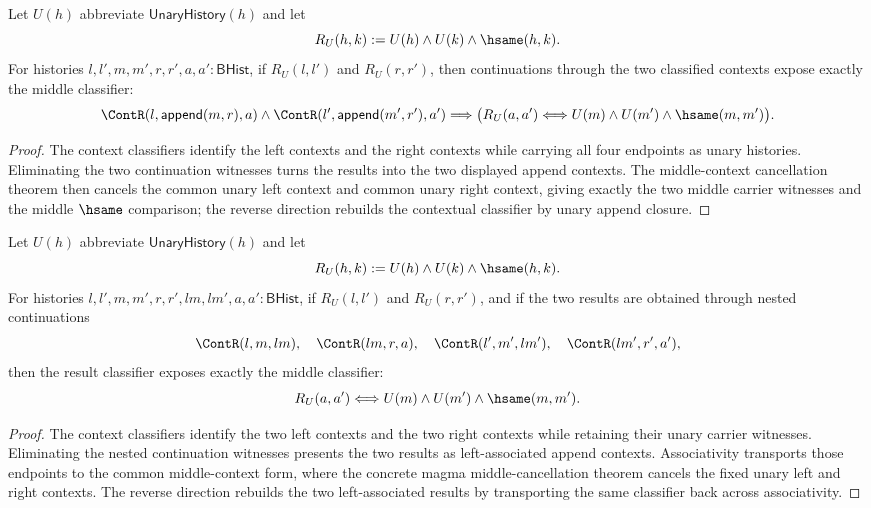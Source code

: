 \begin{theorem}
\label{thm:concrete-unary-history-magma-cont-common-context-classifier}
Let $U(h)$ abbreviate $\mathsf{UnaryHistory}(h)$ and let
$$
R_U(h,k):=U(h)\land U(k)\land\hsame(h,k).
$$
For histories $l,l',m,m',r,r',a,a':\mathsf{BHist}$, if
$R_U(l,l')$ and $R_U(r,r')$, then continuations through the two classified
contexts expose exactly the middle classifier:
$$
\ContR(l,\mathsf{append}(m,r),a)\land
\ContR(l',\mathsf{append}(m',r'),a')
\Longrightarrow
\bigl(R_U(a,a')\Longleftrightarrow
  U(m)\land U(m')\land\hsame(m,m')\bigr).
$$
\end{theorem}
\begin{proof}
The context classifiers identify the left contexts and the right contexts
while carrying all four endpoints as unary histories. Eliminating the two
continuation witnesses turns the results into the two displayed append
contexts. The middle-context cancellation theorem then cancels the common
unary left context and common unary right context, giving exactly the two
middle carrier witnesses and the middle $\hsame$ comparison; the reverse
direction rebuilds the contextual classifier by unary append closure.
\end{proof}

\begin{theorem}
\label{thm:concrete-unary-history-magma-cont-nested-common-context-classifier}
Let $U(h)$ abbreviate $\mathsf{UnaryHistory}(h)$ and let
$$
R_U(h,k):=U(h)\land U(k)\land\hsame(h,k).
$$
For histories $l,l',m,m',r,r',lm,lm',a,a':\mathsf{BHist}$, if
$R_U(l,l')$ and $R_U(r,r')$, and if the two results are obtained through
nested continuations
$$
\ContR(l,m,lm),\quad \ContR(lm,r,a),\quad
\ContR(l',m',lm'),\quad \ContR(lm',r',a'),
$$
then the result classifier exposes exactly the middle classifier:
$$
R_U(a,a')
\Longleftrightarrow
U(m)\land U(m')\land\hsame(m,m').
$$
\end{theorem}
\begin{proof}
The context classifiers identify the two left contexts and the two right
contexts while retaining their unary carrier witnesses. Eliminating the nested
continuation witnesses presents the two results as left-associated append
contexts. Associativity transports those endpoints to the common middle-context
form, where the concrete magma middle-cancellation theorem cancels the fixed
unary left and right contexts. The reverse direction rebuilds the two
left-associated results by transporting the same classifier back across
associativity.
\end{proof}

